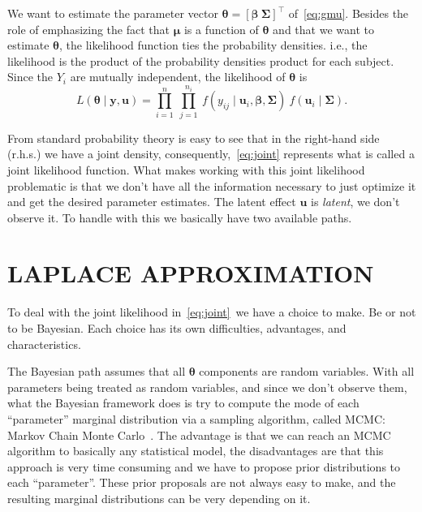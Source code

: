 We want to estimate the parameter vector \(\bm{\theta} =
[\bm{\beta}~\bm{\Sigma}]^{\top}\) of~\autoref{eq:gmu}. Besides the role
of emphasizing the fact that \(\bm{\mu}\) is a function of
\(\bm{\theta}\) and that we want to estimate \(\bm{\theta}\), the
likelihood function ties the probability densities. i.e., the likelihood
is the product of the probability densities product for each subject.
Since the \(Y_{i}\) are mutually independent, the likelihood of
\(\bm{\theta}\) is
\begin{equation}
  L(\bm{\theta} \mid \mathbf{y}, \mathbf{u}) =
  \prod_{i=1}^{n}~\prod_{j=1}^{n_{i}}~
  f(y_{ij} \mid \mathbf{u}_{i}, \bm{\beta}, \bm{\Sigma})~
  f(\mathbf{u}_{i} \mid \bm{\Sigma}).
  \label{eq:joint}
\end{equation}

From standard probability theory is easy to see that in the right-hand
side (r.h.s.) we have a joint density, consequently,~\autoref{eq:joint}
represents what is called a joint likelihood function. What makes
working with this joint likelihood problematic is that we don't have all
the information necessary to just optimize it and get the desired
parameter estimates. The latent effect \(\mathbf{u}\) is
\textit{latent}, we don't observe it. To handle with this we basically
have two available paths.

\section{LAPLACE APPROXIMATION}
\label{cap:laplace}

To deal with the joint likelihood in~\autoref{eq:joint}~we have a choice
to make. Be or not to be Bayesian. Each choice has its own difficulties,
advantages, and characteristics.

The Bayesian path assumes that all \(\bm{\theta}\) components are random
variables. With all parameters being treated as random variables, and
since we don't observe them, what the Bayesian framework does is try to
compute the mode of each ``parameter'' marginal distribution via a
sampling algorithm, called MCMC: Markov Chain Monte Carlo~\cite{MCMC,
  Diaconis}. The advantage is that we can reach an MCMC algorithm to
basically any statistical model, the disadvantages are that this
approach is very time consuming and we have to propose prior
distributions to each ``parameter''. These prior proposals are not
always easy to make, and the resulting marginal distributions can be
very depending on it.

